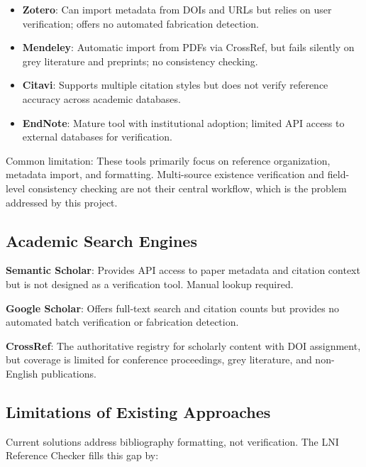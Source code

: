 \documentclass[12pt,a4paper,oneside]{report}
\begin{document}
\begin{itemize}
    \item \textbf{Zotero}: Can import metadata from DOIs and URLs but relies on 
    user verification; offers no automated fabrication detection.
    
    \item \textbf{Mendeley}: Automatic import from PDFs via CrossRef, but fails 
    silently on grey literature and preprints; no consistency checking.
    
    \item \textbf{Citavi}: Supports multiple citation styles but does not verify 
    reference accuracy across academic databases.
    
    \item \textbf{EndNote}: Mature tool with institutional adoption; limited API 
    access to external databases for verification.
\end{itemize}

Common limitation: These tools primarily focus on reference organization, 
metadata import, and formatting. Multi-source existence verification and 
field-level consistency checking are not their central workflow, which is 
the problem addressed by this project.

\subsection{Academic Search Engines}

\textbf{Semantic Scholar}: Provides API access to paper metadata and citation 
context but is not designed as a verification tool. Manual lookup required.

\textbf{Google Scholar}: Offers full-text search and citation counts but provides 
no automated batch verification or fabrication detection.

\textbf{CrossRef}: The authoritative registry for scholarly content with DOI 
assignment, but coverage is limited for conference proceedings, grey literature, 
and non-English publications.

\subsection{Limitations of Existing Approaches}

Current solutions address bibliography formatting, not verification. The LNI 
Reference Checker fills this gap by:
\end{document}

